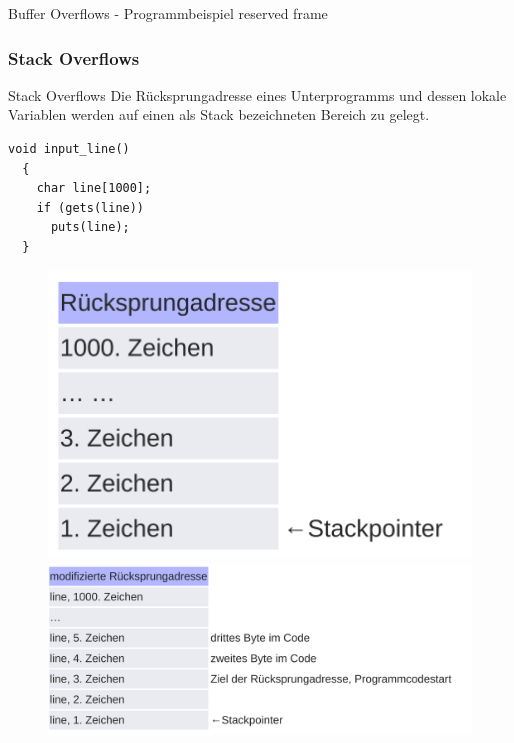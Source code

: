 \documentclass[10pt]{beamer}
\begin{document}
\begin{frame}[fragile]{Buffer Overflows - Programmbeispiel}
  reserved frame
\end{frame}

\subsubsection{Stack Overflows}

\begin{frame}[fragile]{Stack Overflows}
 Die R\"ucksprungadresse eines Unterprogramms und dessen lokale Variablen werden auf einen als Stack bezeichneten Bereich zu gelegt.
 \begin{lstlisting}[style=CStyle]
  void input_line()
  {
    char line[1000];
    if (gets(line))
      puts(line);
  }
 \end{lstlisting}

 \begin{figure}%
  \centering
  {\includegraphics[scale=0.10]{stackoverflow}}%
  \quad
  {\includegraphics[scale=0.10]{stackoverflow_2}}%
 \end{figure}
\end{frame}
\end{document}
